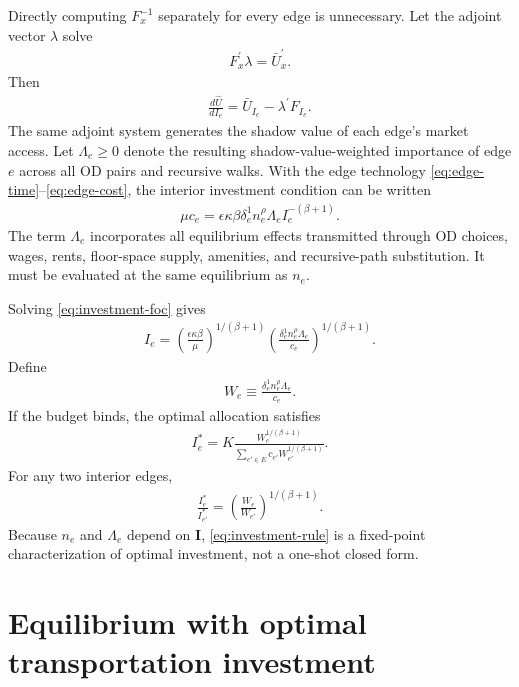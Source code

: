 \documentclass[12pt,a4paper]{article}
\newcommand{\1}{\mathbb 1}
\begin{document}
Directly computing $F_x^{-1}$ separately for every edge is unnecessary. Let the adjoint vector $\lambda$ solve
\begin{align}
F_x^{\prime}\lambda
=
\bar U_x^{\prime}.
\label{eq:adjoint-system}
\end{align}
Then
\begin{align}
\frac{d\widehat U}{dI_e}
=
\bar U_{I_e}-\lambda^{\prime}F_{I_e}.
\label{eq:adjoint-gradient}
\end{align}
The same adjoint system generates the shadow value of each edge's market access. Let $\Lambda_e\geq0$ denote the resulting shadow-value-weighted importance of edge $e$ across all OD pairs and recursive walks. With the edge technology \eqref{eq:edge-time}--\eqref{eq:edge-cost}, the interior investment condition can be written
\begin{align}
\mu c_e
=
\epsilon\kappa\beta
\delta_e^1n_e^{\rho}\Lambda_e
I_e^{-(\beta+1)}.
\label{eq:investment-foc}
\end{align}
The term $\Lambda_e$ incorporates all equilibrium effects transmitted through OD choices, wages, rents, floor-space supply, amenities, and recursive-path substitution. It must be evaluated at the same equilibrium as $n_e$.

Solving \eqref{eq:investment-foc} gives
\begin{align}
I_e
=
\left(
\frac{\epsilon\kappa\beta}{\mu}
\right)^{1/(\beta+1)}
\left(
\frac{\delta_e^1n_e^{\rho}\Lambda_e}{c_e}
\right)^{1/(\beta+1)}.
\label{eq:investment-level}
\end{align}
Define
\begin{align}
W_e
\equiv
\frac{\delta_e^1n_e^{\rho}\Lambda_e}{c_e}.
\label{eq:edge-weight}
\end{align}
If the budget binds, the optimal allocation satisfies
\begin{align}
\boxed{
I_e^*
=
K
\frac{W_e^{1/(\beta+1)}}
{\displaystyle\sum_{e'\in E}c_{e'}W_{e'}^{1/(\beta+1)}}.
}
\label{eq:investment-rule}
\end{align}
For any two interior edges,
\begin{align}
\frac{I_e^*}{I_{e'}^*}
=
\left(
\frac{W_e}{W_{e'}}
\right)^{1/(\beta+1)}.
\label{eq:investment-ratio}
\end{align}
Because $n_e$ and $\Lambda_e$ depend on $\mathbf I$, \eqref{eq:investment-rule} is a fixed-point characterization of optimal investment, not a one-shot closed form.

\section{Equilibrium with optimal transportation investment}
\end{document}
